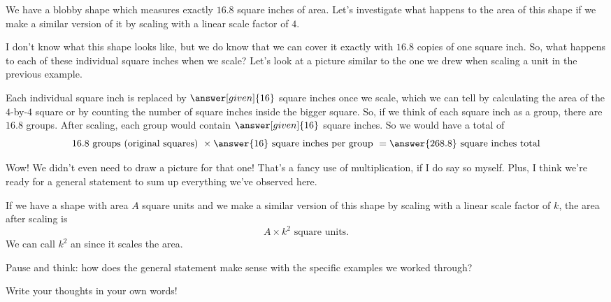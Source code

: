 \documentclass{ximera}
\begin{document}
\begin{example}
We have a blobby shape which measures exactly $16.8$ square inches of area. Let's investigate what happens to the area of this shape if we make a similar version of it by scaling with a linear scale factor of $4$.

I don't know what this shape looks like, but we do know that we can cover it exactly with $16.8$ copies of one square inch. So, what happens to each of these individual square inches when we scale? Let's look at a picture similar to the one we drew when scaling a unit in the previous example.
\begin{image}
\end{image}
Each individual square inch is replaced by $\answer[given]{16}$ square inches once we scale, which we can tell by calculating the area of the $4$-by-$4$ square or by counting the number of square inches inside the bigger square. So, if we think of each square inch as a group, there are $16.8$ groups. After scaling, each group would contain $\answer[given]{16}$ square inches. So we would have a total of 
\[
16.8 \textrm{ groups (original squares) } \times \answer{16} \textrm{ square inches per group } = \answer{268.8} \textrm{ square inches total}
\]

\end{example}
Wow! We didn't even need to draw a picture for that one! That's a fancy use of multiplication, if I do say so myself. Plus, I think we're ready for a general statement to sum up everything we've observed here.

\begin{theorem}
If we have a shape with area $A$ square units and we make a similar version of this shape by scaling with a linear scale factor of $k$, the area after scaling is
\[
A \times k^2 \textrm{ square units.}
\]
We can call $k^2$ an  since it scales the area.
\end{theorem}

\begin{question}
Pause and think: how does the general statement make sense with the specific examples we worked through?
\begin{freeResponse}
Write your thoughts in your own words!
\end{freeResponse}
\end{question}
\end{document}
